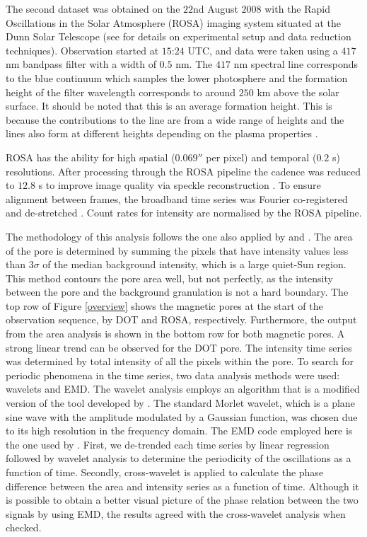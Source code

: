     The second dataset was obtained on the $22$nd August $2008$ with the Rapid Oscillations in the Solar Atmosphere (ROSA) imaging system situated at the Dunn Solar Telescope (see \citealt{jess1} for details on experimental setup and data reduction techniques).
    Observation started at $15$:$24$ UTC, and data were taken using a $417$ nm bandpass filter with a width of $0.5$ nm.
    The $417$ nm spectral line corresponds to the blue continuum which samples the lower photosphere and the formation height of the filter wavelength corresponds to around $250$ km above the solar surface.
    It should be noted that this is an average formation height. 
    This is because the contributions to the line are from a wide range of heights and the lines also form at different heights depending on the plasma properties \citep{gband}.
    
    ROSA has the ability for high spatial ($0.069''$ per pixel) and temporal ($0.2$ s) resolutions.
    After processing through the ROSA pipeline the cadence was reduced to $12.8$ s to improve image quality via speckle reconstruction \citep{20764}.
    To ensure alignment between frames, the broadband time series was Fourier co-registered and de-stretched \citep{2007A&A...473..943J}.
    Count rates for intensity are normalised by the ROSA pipeline.
    
    The methodology of this analysis follows the one also applied by \citet{morton2011} and \cite{Dorotovic2014}.
    The area of the pore is determined by summing the pixels that have intensity values less than $3\sigma$ of the median background intensity, which is a large quiet-Sun region. 
    This method contours the pore area well, but not perfectly, as the intensity between the pore and the background granulation is not a hard boundary.
    The top row of Figure \ref{overview} shows the magnetic pores at the start of the observation sequence, by DOT and ROSA, respectively. 
    Furthermore, the output from the area analysis is shown in the bottom row for both magnetic pores.
    A strong linear trend can be observed for the DOT pore.
    The intensity time series was determined by total intensity of all the pixels within the pore.
    To search for periodic phenomena in the time series, two data analysis methods were used: wavelets and EMD.
    The wavelet analysis employs an algorithm that is a modified version of the tool developed by \citet{torrence}.
    The standard Morlet wavelet, which is a plane sine wave with the amplitude modulated by a Gaussian function, was chosen due to its high resolution in the frequency domain.
    The EMD code employed here is the one used by \citet{terradas}.
    First, we de-trended each time series by linear regression followed by wavelet analysis to determine the periodicity of the oscillations as a function of time.
    Secondly, cross-wavelet is applied to calculate the phase difference between the area and intensity series as a function of time.
    Although it is possible to obtain a better visual picture of the phase relation between the two signals by using EMD, the results agreed with the cross-wavelet analysis when checked. 
    
